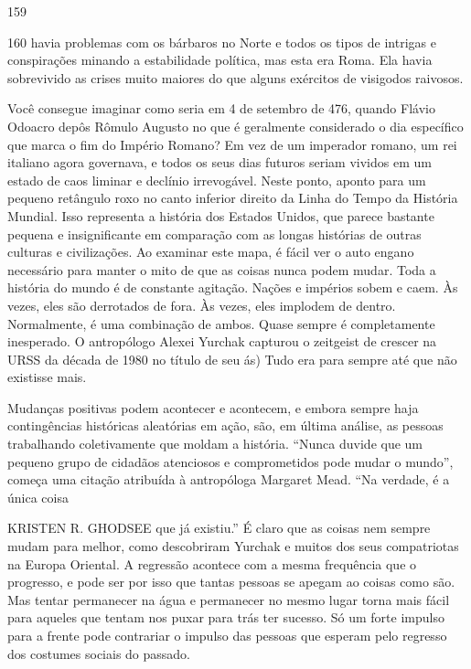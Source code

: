  \par 
159
 \par 
160 havia problemas com os bárbaros no Norte e todos os tipos de intrigas e conspirações minando a estabilidade política, mas esta era Roma. Ela havia sobrevivido as crises muito maiores do que alguns exércitos de visigodos raivosos.
 \par 
Você consegue imaginar como seria em {\color{blue}4} de setembro de 476, quando Flávio Odoacro depôs Rômulo Augusto no que é geralmente considerado o dia específico que marca o fim do Império Romano? Em vez de um imperador romano, um rei italiano agora governava, e todos os seus dias futuros seriam vividos em um estado de caos liminar e declínio irrevogável. Neste ponto, aponto para um pequeno retângulo roxo no canto inferior direito da Linha do Tempo da História Mundial. Isso representa a história dos Estados Unidos, que parece bastante pequena e insignificante em comparação com as longas histórias de outras culturas e civilizações. Ao examinar este mapa, é fácil ver o auto engano necessário para manter o mito de que as coisas nunca podem mudar. Toda a história do mundo é de constante agitação. Nações e impérios sobem e caem. Às vezes, eles são derrotados de fora. Às vezes, eles implodem de dentro. Normalmente, é uma combinação de ambos. Quase sempre é completamente inesperado. O antropólogo Alexei Yurchak capturou o zeitgeist de crescer na URSS da década de 1980 no título de seu ás) Tudo era para sempre até que não existisse mais.
 \par 
Mudanças positivas podem acontecer e acontecem, e embora sempre haja contingências históricas aleatórias em ação, são, em última análise, as pessoas trabalhando coletivamente que moldam a história. “Nunca duvide que um pequeno grupo de cidadãos atenciosos e comprometidos pode mudar o mundo”, começa uma citação atribuída à antropóloga Margaret Mead. “Na verdade, é a única coisa
 \par 
KRISTEN R. GHODSEE que já existiu.” É claro que as coisas nem sempre mudam para melhor, como descobriram Yurchak e muitos dos seus compatriotas na Europa Oriental. A regressão acontece com a mesma frequência que o progresso, e pode ser por isso que tantas pessoas se apegam ao coisas como são. Mas tentar permanecer na água e permanecer no mesmo lugar torna mais fácil para aqueles que tentam nos puxar para trás ter sucesso. Só um forte impulso para a frente pode contrariar o impulso das pessoas que esperam pelo regresso dos costumes sociais do passado.
 \par 
